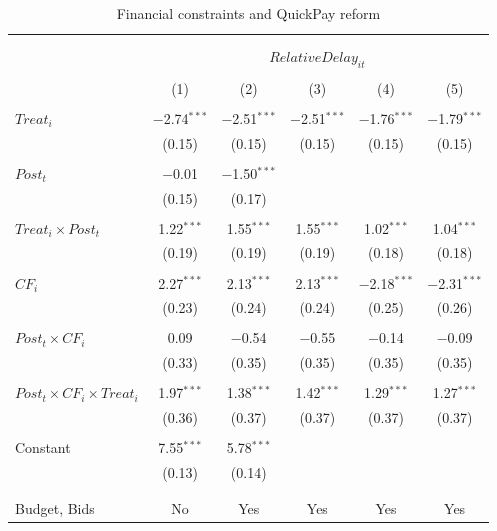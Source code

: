 \documentclass[
]{article}
\begin{document}
\begin{table}[H] \centering 
  \caption{Financial constraints and QuickPay reform} 
  \label{} 
\small 
\begin{tabular}{@{\extracolsep{-2pt}}lccccc} 
\\[-1.8ex]\hline 
\hline \\[-1.8ex] 
\\[-1.8ex] & \multicolumn{5}{c}{$RelativeDelay_{it}$} \\ 
\\[-1.8ex] & (1) & (2) & (3) & (4) & (5)\\ 
\hline \\[-1.8ex] 
 $Treat_i$ & $-$2.74$^{***}$ & $-$2.51$^{***}$ & $-$2.51$^{***}$ & $-$1.76$^{***}$ & $-$1.79$^{***}$ \\ 
  & (0.15) & (0.15) & (0.15) & (0.15) & (0.15) \\ 
  & & & & & \\ 
 $Post_t$ & $-$0.01 & $-$1.50$^{***}$ &  &  &  \\ 
  & (0.15) & (0.17) &  &  &  \\ 
  & & & & & \\ 
 $Treat_i \times Post_t$ & 1.22$^{***}$ & 1.55$^{***}$ & 1.55$^{***}$ & 1.02$^{***}$ & 1.04$^{***}$ \\ 
  & (0.19) & (0.19) & (0.19) & (0.18) & (0.18) \\ 
  & & & & & \\ 
 $CF_i$ & 2.27$^{***}$ & 2.13$^{***}$ & 2.13$^{***}$ & $-$2.18$^{***}$ & $-$2.31$^{***}$ \\ 
  & (0.23) & (0.24) & (0.24) & (0.25) & (0.26) \\ 
  & & & & & \\ 
 $Post_t \times CF_i$ & 0.09 & $-$0.54 & $-$0.55 & $-$0.14 & $-$0.09 \\ 
  & (0.33) & (0.35) & (0.35) & (0.35) & (0.35) \\ 
  & & & & & \\ 
 $Post_t \times CF_i \times Treat_i$ & 1.97$^{***}$ & 1.38$^{***}$ & 1.42$^{***}$ & 1.29$^{***}$ & 1.27$^{***}$ \\ 
  & (0.36) & (0.37) & (0.37) & (0.37) & (0.37) \\ 
  & & & & & \\ 
 Constant & 7.55$^{***}$ & 5.78$^{***}$ &  &  &  \\ 
  & (0.13) & (0.14) &  &  &  \\ 
  & & & & & \\ 
\hline \\[-1.8ex] 
Budget, Bids & No & Yes & Yes & Yes & Yes \\ 

\end{tabular}
\end{table}
\end{document}
